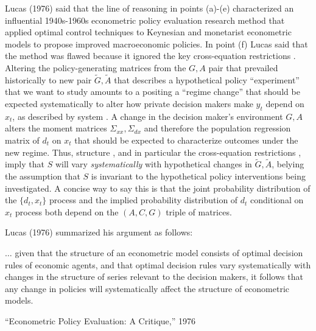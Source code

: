 Lucas (1976) said that the  line of reasoning in points (a)-(e)    characterized an influential  1940s-1960s econometric policy evaluation
research method that  applied optimal control techniques to Keynesian and monetarist
econometric models to propose  improved  macroeconomic policies. 
In point (f) Lucas said that the method was flawed because it  ignored
 the key cross-equation restrictions . Altering the policy-generating
matrices from the $G, A$ pair that prevailed historically to new pair  $\tilde G, \tilde A$ that describes a  hypothetical policy ``experiment'' that we want to study
  amounts to a  positing a  ``regime change'' that
 should be expected  systematically to alter how private decision makers make  $y_t$ depend on $x_t$, as
 described by
 system .  %
 A
 change in the decision maker's  environment $G, A$   alters the moment matrices
$ \Sigma_{xx}, \Sigma_{dx}$ and therefore the population regression matrix of $d_t$ on $x_t$ that should be 
expected to characterize outcomes
under the new  regime. Thus,  structure , and in particular the cross-equation restrictions ,
imply that $S$ will vary {\it systematically\/} with  hypothetical changes
in  $\tilde G, \tilde A$, belying the assumption that $S$ is invariant to the hypothetical policy interventions being investigated.
A concise way to say this is that the joint probability distribution of the $\{d_t, x_t\}$ process and the implied
  probability distribution
of $d_t$ conditional on  $x_t$ process both  depend on the $(A, C, G)$ triple of matrices.

Lucas (1976) summarized his argument as follows:

\epigraph{$\ldots$ given that the structure of an econometric model consists of optimal decision rules of economic agents, and
that optimal decision rules vary systematically with changes in the structure of series relevant to the decision makers, it follows
that any change in policies will systematically affect the structure of econometric models.}{``Econometric Policy Evaluation: A Critique,'' 1976}


